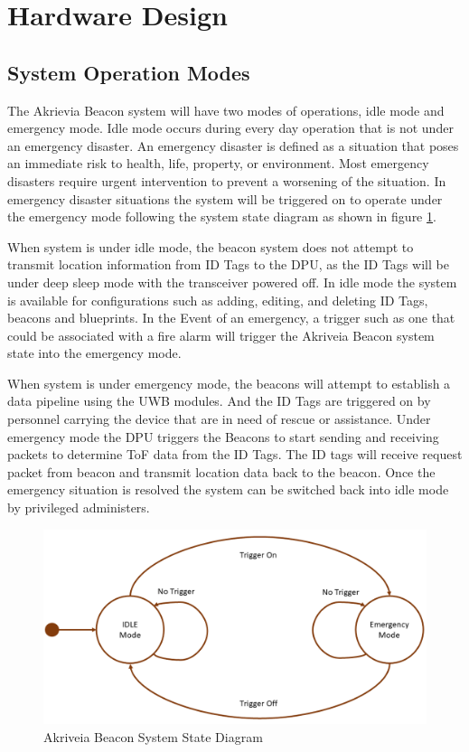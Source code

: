 

\setcounter{section}{3}
\section{Hardware Design}
\bigskip
\subsection{System Operation Modes}
\medskip
The Akrievia Beacon system will have two modes of operations, idle mode and emergency mode. Idle mode occurs during every day operation that is not under an emergency disaster. An emergency disaster is defined as a situation that poses an immediate risk to health, life, property, or environment. Most emergency disasters require urgent intervention to prevent a worsening of the situation. In emergency disaster situations the system will be triggered on to operate under the emergency mode following the system state diagram as shown in figure \ref{sys_state}.

\bigskip
When system is under idle mode, the beacon system does not attempt to transmit location information from ID Tags to the DPU, as the ID Tags will be under deep sleep mode with the transceiver powered off. In idle mode the system is available for configurations such as adding, editing, and deleting ID Tags, beacons and blueprints. In the Event of an emergency, a trigger such as one that could be associated with a fire alarm will trigger the Akriveia Beacon system state into the emergency mode.

\bigskip
When system is under emergency mode, the beacons will attempt to establish a data pipeline using the UWB modules. And the ID Tags are triggered on by personnel carrying the device that are in need of rescue or assistance. Under emergency mode the DPU triggers the Beacons to start sending and receiving packets to determine ToF data from the ID Tags. The ID tags will receive request packet from beacon and transmit location data back to the beacon. Once the emergency situation is resolved the system can be switched back into idle mode by privileged administers.

\medskip
\begin{figure}[H]
\centering
    \includegraphics[width=\linewidth]{./images/state_d.png}
    \caption{Akriveia Beacon System State Diagram}
    \label{sys_state}
\end{figure}
\medskip



